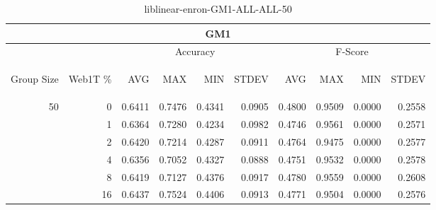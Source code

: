 \begin{center}
\begin{table}[htbp] 
 \begin{center}
\begin{tabular}{ | r | r | r | r | r | r | r | r | r | r |}
\hline
\multicolumn{10}{|c|}{GM1}\\
\hline
 & & \multicolumn{4}{|c|}{Accuracy} & \multicolumn{4}{|c|}{F-Score}\\ \cline{3-10}
\begin{sideways}Group Size\end{sideways} & \begin{sideways}Web1T \%\end{sideways} & \begin{sideways}AVG\end{sideways} & \begin{sideways}MAX\end{sideways} & \begin{sideways}MIN\end{sideways} & \begin{sideways}STDEV\end{sideways} & \begin{sideways}AVG\end{sideways} & \begin{sideways}MAX\end{sideways} & \begin{sideways}MIN\end{sideways} & \begin{sideways}STDEV\end{sideways}\\
\hline
\multirow{5}{*}{50}
 & 0 & 0.6411 & 0.7476 & 0.4341 & 0.0905 & 0.4800 & 0.9509 & 0.0000 & 0.2558\\ \cline{2-10}
 & 1 & 0.6364 & 0.7280 & 0.4234 & 0.0982 & 0.4746 & 0.9561 & 0.0000 & 0.2571\\ \cline{2-10}
 & 2 & 0.6420 & 0.7214 & 0.4287 & 0.0911 & 0.4764 & 0.9475 & 0.0000 & 0.2577\\ \cline{2-10}
 & 4 & 0.6356 & 0.7052 & 0.4327 & 0.0888 & 0.4751 & 0.9532 & 0.0000 & 0.2578\\ \cline{2-10}
 & 8 & 0.6419 & 0.7127 & 0.4376 & 0.0917 & 0.4780 & 0.9559 & 0.0000 & 0.2608\\ \cline{2-10}
 & 16 & 0.6437 & 0.7524 & 0.4406 & 0.0913 & 0.4771 & 0.9504 & 0.0000 & 0.2576\\ \cline{2-10}
\hline
\end{tabular}
\caption{liblinear-enron-GM1-ALL-ALL-50}
\label{table:liblinear-enron-GM1-ALL-ALL-50}
\end{center}
 \end{table}
\end{center}

